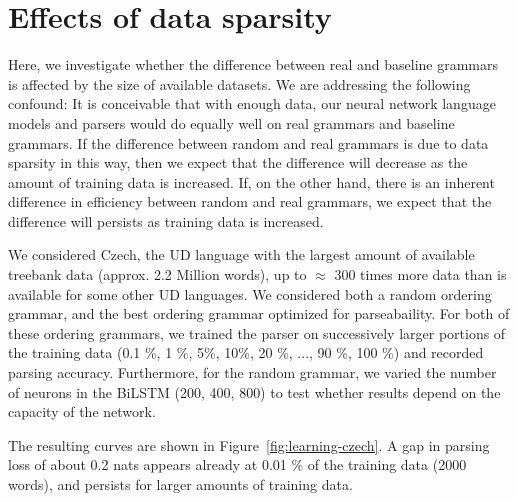 \documentclass[10pt,twoside,lineno]{article}
\begin{document}
\section{Effects of data sparsity}

Here, we investigate whether the difference between real and baseline grammars is affected by the size of available datasets.
We are addressing the following confound: It is conceivable that with enough data, our neural network language models and parsers would do equally well on real grammars and baseline grammars.
If the difference between random and real grammars is due to data sparsity in this way, then we expect that the difference will decrease as the amount of training data is increased.
If, on the other hand, there is an inherent difference in efficiency between random and real grammars, we expect that the difference will persists as training data is increased.

We considered Czech, the UD language with the largest amount of available treebank data (approx. 2.2 Million words), up to $\approx$ 300 times more data than is available for some other UD languages.
We considered both a random ordering grammar, and the best ordering grammar optimized for parseabaility.
For both of these ordering grammars, we trained the parser on successively larger portions of the training data (0.1 \%, 1 \%, 5\%, 10\%, 20 \%, ..., 90 \%, 100 \%) and recorded parsing accuracy.
Furthermore, for the random grammar, we varied the number of neurons in the BiLSTM (200, 400, 800) to test whether results depend on the capacity of the network.


The resulting curves are shown in Figure~\ref{fig:learning-czech}.
A gap in parsing loss of about 0.2 nats appears already at 0.01 \% of the training data (2000 words), and persists for larger amounts of training data.
\end{document}
